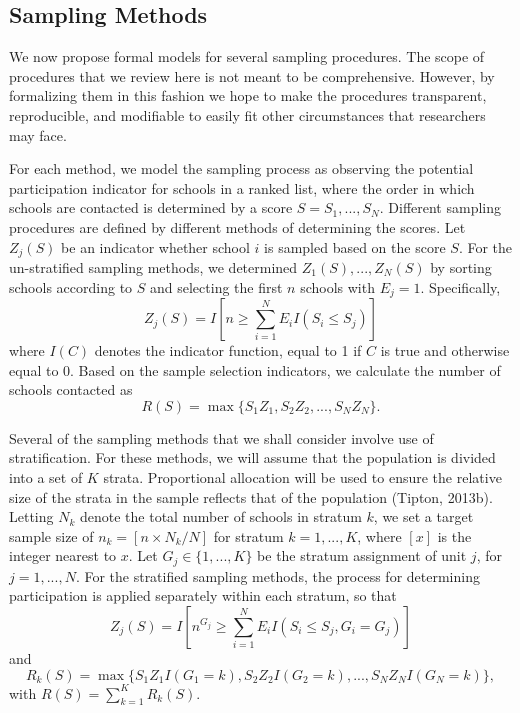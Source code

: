 \documentclass[english,man,floatsintext]{apa6}
\begin{document}
\hypertarget{sampling-methods}{%
\subsection{Sampling Methods}\label{sampling-methods}}

We now propose formal models for several sampling procedures. The scope of procedures that we review here is not meant to be comprehensive. However, by formalizing them in this fashion we hope to make the procedures transparent, reproducible, and modifiable to easily fit other circumstances that researchers may face.

For each method, we model the sampling process as observing the potential participation indicator for schools in a ranked list, where the order in which schools are contacted is determined by a score \(S = S_1,...,S_N\). Different sampling procedures are defined by different methods of determining the scores. Let \(Z_j(S)\) be an indicator whether school \(i\) is sampled based on the score \(S\).
For the un-stratified sampling methods, we determined \(Z_1(S),...,Z_N(S)\) by sorting schools according to \(S\) and selecting the first \(n\) schools with \(E_j = 1\).
Specifically,
\begin{equation}
\label{eq:Zj}
Z_j(S) = I\left[n \geq \sum_{i=1}^N E_i I\left(S_i \leq S_j\right)\right]
\end{equation}
where \(I(C)\) denotes the indicator function, equal to 1 if \(C\) is true and otherwise equal to 0. Based on the sample selection indicators, we calculate the number of schools contacted as
\begin{equation}
\label{eq:R}
R(S) = \max \{S_1 Z_1, S_2 Z_2, ..., S_N Z_N\}.
\end{equation}

Several of the sampling methods that we shall consider involve use of stratification. For these methods, we will assume that the population is divided into a set of \(K\) strata. Proportional allocation will be used to ensure the relative size of the strata in the sample reflects that of the population (Tipton, 2013b).
Letting \(N_k\) denote the total number of schools in stratum \(k\), we set a target sample size of \(n_k = [n \times N_k / N]\) for stratum \(k = 1,...,K\), where \([x]\) is the integer nearest to \(x\).
Let \(G_j \in \{1,...,K\}\) be the stratum assignment of unit \(j\), for \(j = 1,...,N\).
For the stratified sampling methods, the process for determining participation is applied separately within each stratum, so that
\begin{equation}
\label{eq:Zj-strat}
Z_j(S) = I\left[n^{G_j} \geq \sum_{i=1}^N E_i I\left(S_i \leq S_j, G_i = G_j\right)\right]
\end{equation}
and
\begin{equation}
\label{eq:R-strat}
R_k(S) = \max \{S_1 Z_1 I(G_1=k) , S_2 Z_2 I(G_2=k), ..., S_N Z_N I(G_N=k)\},
\end{equation}
with \(R(S) = \sum_{k=1}^K R_k(S)\).
\end{document}
